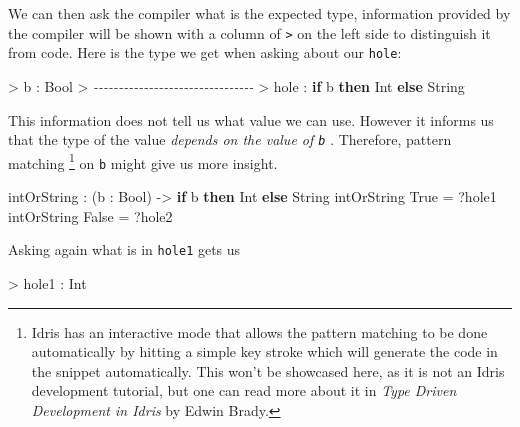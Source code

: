 \documentclass[
]{article}
\newenvironment{Shaded}{}{}
\newcommand{\CommentTok}[1]{\textcolor[rgb]{0.38,0.63,0.69}{\textit{#1}}}
\newcommand{\DataTypeTok}[1]{\textcolor[rgb]{0.56,0.13,0.00}{#1}}
\newcommand{\KeywordTok}[1]{\textcolor[rgb]{0.00,0.44,0.13}{\textbf{#1}}}
\newcommand{\NormalTok}[1]{#1}
\newcommand{\OperatorTok}[1]{\textcolor[rgb]{0.40,0.40,0.40}{#1}}
\newcommand{\OtherTok}[1]{\textcolor[rgb]{0.00,0.44,0.13}{#1}}
\begin{document}
We can then ask the compiler what is the expected type, information
provided by the compiler will be shown with a column of
\texttt{\textgreater{}} on the left side to distinguish it from code.
Here is the type we get when asking about our \texttt{hole}:

\begin{Shaded}
\begin{Highlighting}[]
\OperatorTok{\textgreater{}}\NormalTok{ b }\OperatorTok{:} \DataTypeTok{Bool}
\OperatorTok{\textgreater{}} \CommentTok{{-}{-}{-}{-}{-}{-}{-}{-}{-}{-}{-}{-}{-}{-}{-}{-}{-}{-}{-}{-}{-}{-}{-}{-}{-}{-}{-}{-}{-}{-}{-}{-}}
\OperatorTok{\textgreater{}}\NormalTok{ hole }\OperatorTok{:} \KeywordTok{if}\NormalTok{ b }\KeywordTok{then} \DataTypeTok{Int} \KeywordTok{else} \DataTypeTok{String}
\end{Highlighting}
\end{Shaded}

This information does not tell us what value we can use. However it
informs us that the type of the value \emph{depends on the value of
\texttt{b}} . Therefore, pattern matching \footnote{Idris has an
  interactive mode that allows the pattern matching to be done
  automatically by hitting a simple key stroke which will generate the
  code in the snippet automatically. This won't be showcased here, as it
  is not an Idris development tutorial, but one can read more about it
  in \emph{Type Driven Development in Idris} by Edwin Brady.} on
\texttt{b} might give us more insight.

\begin{Shaded}
\begin{Highlighting}[]
\NormalTok{intOrString }\OperatorTok{:}\NormalTok{ (b }\OperatorTok{:} \DataTypeTok{Bool}\NormalTok{) }\OtherTok{{-}\textgreater{}} \KeywordTok{if}\NormalTok{ b }\KeywordTok{then} \DataTypeTok{Int} \KeywordTok{else} \DataTypeTok{String}
\NormalTok{intOrString }\DataTypeTok{True} \OtherTok{=} \OperatorTok{?}\NormalTok{hole1}
\NormalTok{intOrString }\DataTypeTok{False} \OtherTok{=} \OperatorTok{?}\NormalTok{hole2}
\end{Highlighting}
\end{Shaded}

Asking again what is in \texttt{hole1} gets us

\begin{Shaded}
\begin{Highlighting}[]
\OperatorTok{\textgreater{}}\NormalTok{ hole1 }\OperatorTok{:} \DataTypeTok{Int}
\end{Highlighting}
\end{Shaded}
\end{document}
